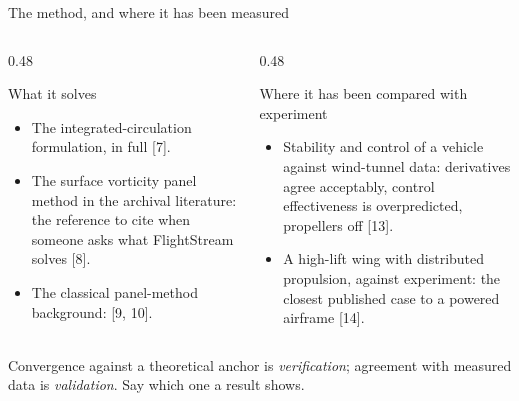 \begin{frame}{The method, and where it has been measured}
\begin{columns}[T]
\begin{column}{0.48\textwidth}
\begin{block}{What it solves}
\begin{itemize}\small
  \item The integrated-circulation formulation, in full [7].
  \item The surface vorticity panel method in the archival literature: the
        reference to cite when someone asks what FlightStream solves [8].
  \item The classical panel-method background: [9, 10].
\end{itemize}
\end{block}
\end{column}
\begin{column}{0.48\textwidth}
\begin{block}{Where it has been compared with experiment}
\begin{itemize}\small
  \item Stability and control of a vehicle against wind-tunnel data:
        derivatives agree acceptably, control effectiveness is overpredicted,
        propellers off [13].
  \item A high-lift wing with distributed propulsion, against experiment: the
        closest published case to a powered airframe [14].
\end{itemize}
\end{block}
\end{column}
\end{columns}
\vspace{1mm}
\begin{takeaway}Convergence against a theoretical anchor is
\emph{verification}; agreement with measured data is \emph{validation}. Say
which one a result shows.\end{takeaway}
\end{frame}
